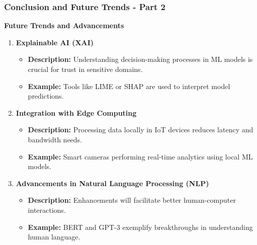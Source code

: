 \documentclass[aspectratio=169]{beamer}
\begin{document}
\begin{frame}[fragile]
  \frametitle{Conclusion and Future Trends - Part 2}
  
  \textbf{Future Trends and Advancements}

  \begin{enumerate}
      \item \textbf{Explainable AI (XAI)}
      \begin{itemize}
          \item \textbf{Description:} 
          Understanding decision-making processes in ML models is crucial for trust in sensitive domains.
          \item \textbf{Example:} 
          Tools like LIME or SHAP are used to interpret model predictions.
      \end{itemize}
      
      \item \textbf{Integration with Edge Computing}
      \begin{itemize}
          \item \textbf{Description:} 
          Processing data locally in IoT devices reduces latency and bandwidth needs.
          \item \textbf{Example:} 
          Smart cameras performing real-time analytics using local ML models.
      \end{itemize}
      
      \item \textbf{Advancements in Natural Language Processing (NLP)}
      \begin{itemize}
          \item \textbf{Description:} 
          Enhancements will facilitate better human-computer interactions.
          \item \textbf{Example:} 
          BERT and GPT-3 exemplify breakthroughs in understanding human language.
      \end{itemize}
  \end{enumerate}
\end{frame}
\end{document}
